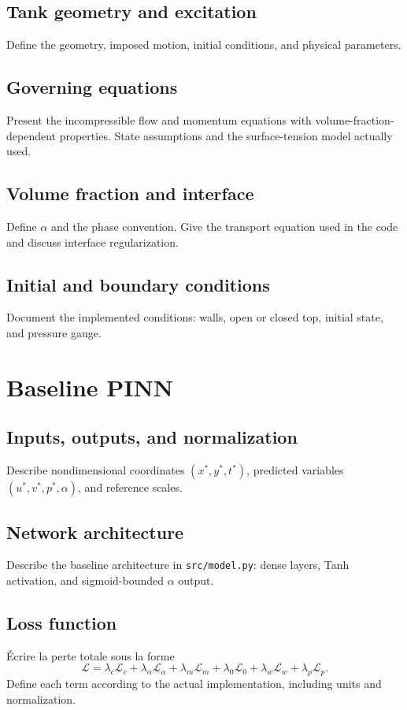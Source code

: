 \documentclass[11pt,a4paper]{article}
\begin{document}
\subsection{Tank geometry and excitation}
Define the geometry, imposed motion, initial conditions, and physical parameters.
\subsection{Governing equations}
Present the incompressible flow and momentum equations with volume-fraction-dependent properties. State assumptions and the surface-tension model actually used.
\subsection{Volume fraction and interface}
Define $\alpha$ and the phase convention. Give the transport equation used in the code and discuss interface regularization.
\subsection{Initial and boundary conditions}
Document the implemented conditions: walls, open or closed top, initial state, and pressure gauge.

\section{Baseline PINN}
\subsection{Inputs, outputs, and normalization}
Describe nondimensional coordinates $(x^*,y^*,t^*)$, predicted variables $(u^*,v^*,p^*,\alpha)$, and reference scales.
\subsection{Network architecture}
Describe the baseline architecture in \texttt{src/model.py}: dense layers, Tanh activation, and sigmoid-bounded $\alpha$ output.
\subsection{Loss function}
Écrire la perte totale sous la forme
\[
\mathcal{L}=\lambda_c\mathcal{L}_{c}
+\lambda_\alpha\mathcal{L}_{\alpha}
+\lambda_m\mathcal{L}_{m}
+\lambda_0\mathcal{L}_{0}
+\lambda_w\mathcal{L}_{w}
+\lambda_p\mathcal{L}_{p}.
\]
Define each term according to the actual implementation, including units and normalization.
\end{document}
